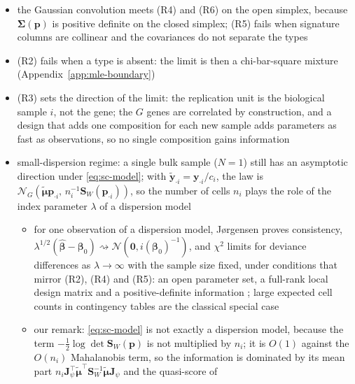 \begin{itemize}
  \item the Gaussian convolution meets (R4) and (R6) on the open simplex, because
        \(\boldsymbol{\Sigma}(\boldsymbol{p})\) is positive definite on the closed simplex; (R5) fails when signature
        columns are collinear and the covariances do not separate the types
  \item (R2) fails when a type is absent: the limit is then a chi-bar-square mixture
        (Appendix~\ref{app:mle-boundary})
  \item (R3) sets the direction of the limit: the replication unit is the biological sample \(i\), not the
        gene; the \(G\) genes are correlated by construction, and a design that adds one composition for
        each new sample adds parameters as fast as observations, so no single composition gains
        information \cite[p.~81]{coxTheoreticalStatistics1979}
  \item small-dispersion regime: a single bulk sample (\(N=1\)) still has an asymptotic direction under
        \eqref{eq:sc-model}; with \(\tilde{\boldsymbol{y}}_{\cdot i}=\boldsymbol{y}_{\cdot i}/c_{i}\), the law is
        \(\mathcal{N}_{G}(\tilde{\boldsymbol{\mu}}\boldsymbol{p}_{\cdot i},\,n_{i}^{-1}\boldsymbol{S}_{W}(\boldsymbol{p}_{\cdot i}))\), so the number of cells
        \(n_{i}\) plays the role of the index parameter \(\lambda\) of a dispersion model
  \begin{itemize}
    \item for one observation of a dispersion model, J{\o}rgensen proves consistency,
          \(\lambda^{1/2}(\hat{\boldsymbol{\beta}}-\boldsymbol{\beta}_{0})\rightsquigarrow\mathcal{N}(\boldsymbol{0},i(\boldsymbol{\beta}_{0})^{-1})\), and \(\chi^{2}\) limits
          for deviance differences as \(\lambda\to\infty\) with the sample size fixed, under conditions that
          mirror (R2), (R4) and (R5): an open parameter set, a full-rank local design matrix and a
          positive-definite information \cite[Theorems~4.1--4.3]{jørgensenSmallDispersionAsymptotics1987};
          large expected cell counts in contingency tables are the classical special case
    \item our remark: \eqref{eq:sc-model} is not exactly a dispersion model, because the term
          \(-\tfrac12\log\det\boldsymbol{S}_{W}(\boldsymbol{p})\) is not multiplied by \(n_{i}\); it is \(O(1)\) against the
          \(O(n_{i})\) Mahalanobis term, so the information is dominated by its mean part
          \(n_{i}\mathbf{J}_{\psi}^{\top}\tilde{\boldsymbol{\mu}}^{\top}\boldsymbol{S}_{W}^{-1}\tilde{\boldsymbol{\mu}}\mathbf{J}_{\psi}\) and the quasi-score of

\end{itemize}
\end{itemize}
